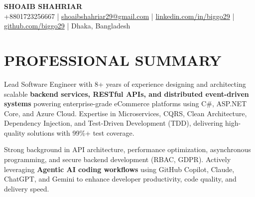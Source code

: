 ﻿\documentclass[letterpaper,10pt]{article}
\begin{document}

\begin{center}
  \textbf{\Huge SHOAIB SHAHRIAR} \\
  \vspace{2pt}
  +8801723256667 | \href{mailto:shoaibshahriar29@gmail.com}{shoaibshahriar29@gmail.com} | \href{https://linkedin.com/in/biggo29/}{linkedin.com/in/biggo29} | \href{https://github.com/biggo29}{github.com/biggo29} | Dhaka, Bangladesh 
\end{center}

\section{PROFESSIONAL SUMMARY}
Lead Software Engineer with 8+ years of experience designing and architecting scalable \textbf{backend services, RESTful APIs, and distributed event-driven systems} powering enterprise-grade eCommerce platforms using C\#, ASP.NET Core, and Azure Cloud. Expertise in Microservices, CQRS, Clean Architecture, Dependency Injection, and Test-Driven Development (TDD), delivering high-quality solutions with 99\%+ test coverage.

Strong background in API architecture, performance optimization, asynchronous programming, and secure backend development (RBAC, GDPR). Actively leveraging \textbf{Agentic AI coding workflows} using GitHub Copilot, Claude, ChatGPT, and Gemini to enhance developer productivity, code quality, and delivery speed.
\end{document}
